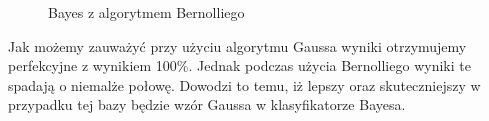 \documentclass[12pt,a4paper]{article}
\begin{document}
\begin{figure}[h!]
        			\label{bayes_bernolli_znorm}
        			\hfil
        			\label{bayes_bernolli_nieznorm}
        			\caption{Bayes z algorytmem Bernolliego}
        		\end{figure}
        		Jak możemy zauważyć przy użyciu algorytmu Gaussa wyniki otrzymujemy perfekcyjne z wynikiem 100\%. Jednak podczas użycia Bernolliego wyniki te spadają o niemalże połowę. Dowodzi to temu, iż lepszy oraz skuteczniejszy w przypadku tej bazy będzie wzór Gaussa w klasyfikatorze Bayesa.
    		
\end{document}
